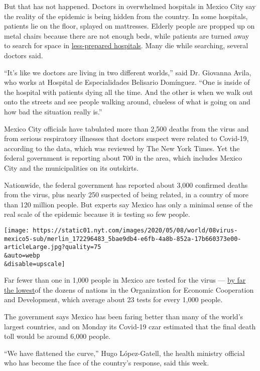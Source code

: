 But that has not happened. Doctors in overwhelmed hospitals in Mexico
City say the reality of the epidemic is being hidden from the country.
In some hospitals, patients lie on the floor, splayed on mattresses.
Elderly people are propped up on metal chairs because there are not
enough beds, while patients are turned away to search for space in
\href{https://www.nytimes.com/2020/05/28/world/americas/virus-mexico-doctors.html}{less-prepared
hospitals}. Many die while searching, several doctors said.

``It's like we doctors are living in two different worlds,'' said Dr.
Giovanna Avila, who works at Hospital de Especialidades Belisario
Domínguez. ``One is inside of the hospital with patients dying all the
time. And the other is when we walk out onto the streets and see people
walking around, clueless of what is going on and how bad the situation
really is.''

Mexico City officials have tabulated more than 2,500 deaths from the
virus and from serious respiratory illnesses that doctors suspect were
related to Covid-19, according to the data, which was reviewed by The
New York Times. Yet the federal government is reporting about 700 in the
area, which includes Mexico City and the municipalities on its
outskirts.

Nationwide, the federal government has reported about 3,000 confirmed
deaths from the virus, plus nearly 250 suspected of being related, in a
country of more than 120 million people. But experts say Mexico has only
a minimal sense of the real scale of the epidemic because it is testing
so few people.

\texttt{[image: https://static01.nyt.com/images/2020/05/08/world/08virus-mexico5-sub/merlin\_172296483\_5bae9db4-e6fb-4a8b-852a-17b660373e00-articleLarge.jpg?quality=75\\\&auto=webp\\\&disable=upscale]}

Far fewer than one in 1,000 people in Mexico are tested for the virus
---
\href{https://www.weforum.org/agenda/2020/04/these-are-the-oecd-countries-testing-most-for-covid-19/}{by
far the lowest}of the dozens of nations in the Organization for Economic
Cooperation and Development, which average about 23 tests for every
1,000 people.

The government says Mexico has been faring better than many of the
world's largest countries, and on Monday its Covid-19 czar estimated
that the final death toll would be around 6,000 people.

``We have flattened the curve,'' Hugo López-Gatell, the health ministry
official who has become the face of the country's response, said this
week.

